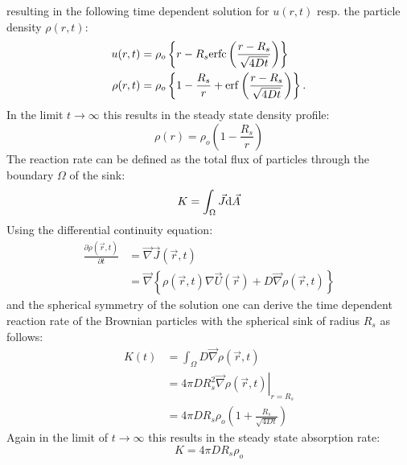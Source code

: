 resulting in the following time dependent solution for $u(r,t)$ resp. the particle density $\rho(r,t)$:
\begin{align}
    u(r,t) &= \rho_o \left\{ r - R_s {\rm erfc} \left( \frac{r - R_s}{\sqrt{4 D t}} \right) \right\} \\
    \rho(r,t) &= \rho_o \left\{ 1 - \frac{R_s}{r} + {\rm erf} \left( \frac{r - R_s}{\sqrt{4Dt}} \right) \right\}.
    \label{u(r,t)}
\end{align}
In the limit $t \rightarrow \infty$ this results in the steady state density profile:
\begin{equation}
    \rho(r) =  \rho_o \left( 1 - \frac{R_s}{r} \right)
    \label{steady_state_density}
\end{equation}
The reaction rate can be defined as the total flux of particles through the boundary $\Omega$ of the sink:
\begin{equation}
    K = \int_\Omega \vec{J} {\rm d}\vec{A} 
    \label{reaction rate}
\end{equation}
Using the differential continuity equation:
\begin{align}
    \frac{\partial \rho(\vec{r},t)}{\partial t}&= \vec{\nabla} \vec{J}(\vec{r},t) \\
    &= \vec{\nabla} \left\{ \rho(\vec{r},t) \nabla \vec{U}(\vec{r}) + D \vec{\nabla} \rho(\vec{r},t) \right\}
    \label{contiuity equation}
\end{align}
and the spherical symmetry of the solution one can derive the time dependent reaction rate of the Brownian particles with the spherical sink of radius $R_s$ as follows:
\begin{align}
    K(t) &= \int_\Omega D  \vec{\nabla} \rho(\vec{r},t) \\
    &= 4 \pi D R_s^2 \left. \vec{\nabla} \rho(\vec{r},t) \right|_{r = R_s}\\
    &= 4 \pi D R_s \rho_o \left( 1 + \frac{R_s}{\sqrt{4Dt}} \right)
    \label{ideal reaction rate}
\end{align}
Again in the limit of $t \rightarrow \infty$ this results in the steady state absorption rate:
\begin{equation}
    K = 4 \pi D R_s \rho_o
    \label{steady state ideal rate}
\end{equation}

